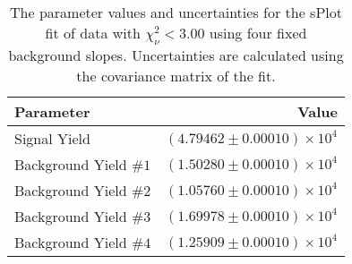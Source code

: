 
\begin{table}[h]
    \begin{center}
        \begin{tabular}{lr}\toprule
            Parameter & Value \\\midrule
            Signal Yield & $(4.79462 \pm 0.00010) \times 10^{4}$ \\
            Background Yield $\#1$ & $(1.50280 \pm 0.00010) \times 10^{4}$ \\
            Background Yield $\#2$ & $(1.05760 \pm 0.00010) \times 10^{4}$ \\
            Background Yield $\#3$ & $(1.69978 \pm 0.00010) \times 10^{4}$ \\
            Background Yield $\#4$ & $(1.25909 \pm 0.00010) \times 10^{4}$ \\\bottomrule
        \end{tabular}
        \caption{The parameter values and uncertainties for the sPlot fit of data with $\chi^2_\nu < 3.00$ using four fixed background slopes. Uncertainties are calculated using the covariance matrix of the fit.}
    \end{center}
\end{table}
